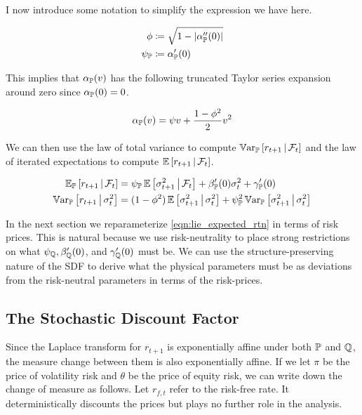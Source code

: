 \documentclass[11pt, letterpaper, twoside, final]{article}
\begin{document}
I now introduce some notation to simplify the expression we have here.

\begin{align}
    \phi &\coloneqq \sqrt{1 - \lvert\alpha_{\mathbb{P}}''(0)\rvert} \\
    \psi_{\mathbb{P}} &\coloneqq \alpha_{\mathbb{P}}'(0)
\end{align}

This implies that $\alpha_{\mathbb{P}}(v)$ has the following truncated Taylor series expansion around zero since
$\alpha_{\mathbb{P}}(0) = 0$.

\begin{equation}
    \label{eqn:alpha_PP_expansion}
    \alpha_{\mathbb{P}}(v) = \psi v + \frac{1 - \phi^2}{2} v^2
\end{equation}

We can then use the law of total variance to compute $\operatorname{\mathbb{V}ar}_{\mathbb{P}}\left[r_{t+1} \,\middle\vert\, \mathcal{F}_t\right]$ and the law of
iterated expectations to compute $\operatorname{\mathbb{E}}\left[r_{t+1} \,\middle\vert\, \mathcal{F}_t \right]$.

\begin{align}
    \label{eqn:lie_expected_rtn}
    \E_{\PP}\left[r_{t+1} \mvert \F_t\right] &= \psi_{\PP} \E\left[\sigma^2_{t+1} \mvert \F_t\right]  +
    \beta_{\PP}'(0) \sigma^2_t + \gamma_{\PP}'(0)  \\
%
    \label{eqn:ltv_rtn_variance}
    \Var_{\PP}\left[r_{t+1} \mvert \sigma^2_t\right]  &= (1 - \phi^2) \E \left[\sigma^2_{t+1} \mvert \sigma^2_t
    \right] + \psi_{\PP}^2 \Var_{\PP}\left[\sigma^2_{t+1} \mvert \sigma^2_t \right] 
\end{align}

In the next section we reparameterize \cref{eqn:lie_expected_rtn} in terms of risk prices.
This is natural because we use risk-neutrality to place strong restrictions on what $\psi_{\mathbb{Q}}, \beta_{\mathbb{Q}}'(0)$,
and $\gamma_{\mathbb{Q}}'(0)$ must be. 
We can  use the structure-preserving nature of the SDF to derive what the physical parameters must be as deviations
from the risk-neutral parameters in terms of the risk-prices.


\subsection{The Stochastic Discount Factor}\label{sec:deriving_sdf_functions}

Since the Laplace transform for $r_{t+1}$  is exponentially affine under both $\mathbb{P}$ and $\mathbb{Q}$, the measure change
between them is also exponentially affine.
If we let $\pi$ be the price of volatility risk and $\theta$ be the price of equity risk, we can write down the
change of measure as follows.
Let $r_{f,t}$ refer to the risk-free rate.
It deterministically discounts the prices but plays no further role in the analysis.
\end{document}
